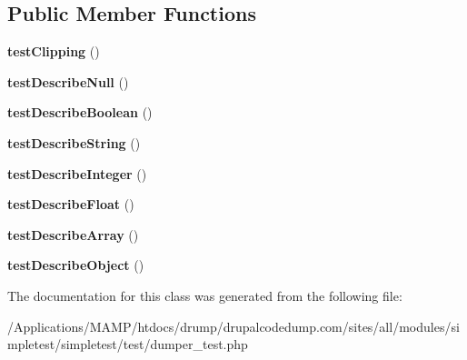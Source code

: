 \subsection*{Public Member Functions}
\begin{DoxyCompactItemize}
\item 
\hypertarget{class_test_of_text_formatting_aa5660440ea7dc33482b31536d634a68b}{
{\bfseries testClipping} ()}
\label{class_test_of_text_formatting_aa5660440ea7dc33482b31536d634a68b}

\item 
\hypertarget{class_test_of_text_formatting_a5569831e3bedaf094469653e12a07b9f}{
{\bfseries testDescribeNull} ()}
\label{class_test_of_text_formatting_a5569831e3bedaf094469653e12a07b9f}

\item 
\hypertarget{class_test_of_text_formatting_a7b425dfa9c3a6ceb4db65deb786e63af}{
{\bfseries testDescribeBoolean} ()}
\label{class_test_of_text_formatting_a7b425dfa9c3a6ceb4db65deb786e63af}

\item 
\hypertarget{class_test_of_text_formatting_a1365075e5bbc286ab955ecdbd9ec310c}{
{\bfseries testDescribeString} ()}
\label{class_test_of_text_formatting_a1365075e5bbc286ab955ecdbd9ec310c}

\item 
\hypertarget{class_test_of_text_formatting_ad6ad5a2a3bd7bf1b10ccfb3da9e52fcd}{
{\bfseries testDescribeInteger} ()}
\label{class_test_of_text_formatting_ad6ad5a2a3bd7bf1b10ccfb3da9e52fcd}

\item 
\hypertarget{class_test_of_text_formatting_afd7b91c15f909b5cafb35d9f4b3263cf}{
{\bfseries testDescribeFloat} ()}
\label{class_test_of_text_formatting_afd7b91c15f909b5cafb35d9f4b3263cf}

\item 
\hypertarget{class_test_of_text_formatting_af0d7bb7a9686be1b17bc9f54fa9340a8}{
{\bfseries testDescribeArray} ()}
\label{class_test_of_text_formatting_af0d7bb7a9686be1b17bc9f54fa9340a8}

\item 
\hypertarget{class_test_of_text_formatting_a09747c48911b4e2722956e5a02080068}{
{\bfseries testDescribeObject} ()}
\label{class_test_of_text_formatting_a09747c48911b4e2722956e5a02080068}

\end{DoxyCompactItemize}


The documentation for this class was generated from the following file:\begin{DoxyCompactItemize}
\item 
/Applications/MAMP/htdocs/drump/drupalcodedump.com/sites/all/modules/simpletest/simpletest/test/dumper\_\-test.php\end{DoxyCompactItemize}

